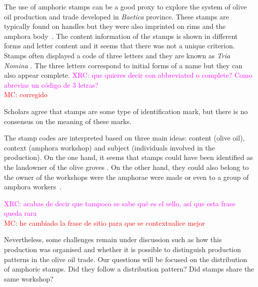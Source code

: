 \documentclass[review]{elsarticle}
\newcommand{\memo}[2]{\textcolor{#1}{#2}}
\newcommand{\maria}[1]{\memo{red}{MC: #1\\}}
\newcommand{\xavi}[1]{\memo{magenta}{XRC: #1\\}}
\begin{document}
The use of amphoric stamps can be a good proxy to explore the system of olive oil production and trade developed in \textit{Baetica} province. These stamps are typically found on handles but they were also imprinted on rims and the amphora body~\citep{millet_anforas_1998}. The content information of the stamps is shown in different forms and letter content and it seems that there was not a unique criterion.
Stamps often displayed a code of three letters and they are known as \textit{Tria Nomina} \citep{berni_millet_amphora_1996}. The three letters correspond to initial forms of a name but they can also appear complete. 
\xavi{que quieres decir con abbreviated o complete? Como abrevias un código de 3 letras?}
\maria{corregido}

Scholars agree that stamps are some type of identification mark, but there is no consensus on the meaning of these marks\citep{rodriguez_baetican_1998}. 


The stamp codes are interpreted based on three main ideas: content (olive oil), context (amphora workshop) and subject (individuals involved in the production). On the one hand, it seems that stamps could have been identified as the landowner of the olive groves \citep{rodriguez_economioleicola_1977}. On the other hand, they could also belong to the owner of the workshops were the amphorae were made or even to a group of amphora workers~\citep{berni_millet_epigrafianforica_2008}. 

\xavi{acabas de decir que tampoco se sabe qué es el sello, así que esta frase queda rara} 
\maria{he cambiado la frase de sitio para que se contextualice mejor}

Nevertheless, some challenges remain under discussion such as how this production was organised and whether it is possible to distinguish production patterns in the olive oil trade. Our questions will be focused on the distribution of amphoric stamps. Did they follow a distribution pattern? Did stamps share the same workshop? 

  
\end{document}
